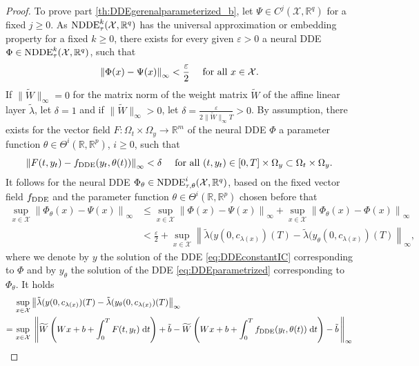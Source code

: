 \documentclass[10pt]{article}
\numberwithin{equation}{section}
\newcommand*{\dd}{\mathrm{d}}
\newcommand{\eps}{\varepsilon}
\newcommand\norm[1]{\left\lVert#1\right\rVert}
\newcommand\normm[1]{\big\lVert#1\big\lVert}
\newcommand\normk[1]{\lVert#1\lVert}
\begin{document}
\begin{proof}
		To prove part \ref{th:DDEgerenalparameterized_b}, let $\Psi \in C^j(\mathcal{X},\mathbb{R}^q)$ for a fixed $j \geq 0$. As $\textup{NDDE}^k_{\tau}(\mathcal{X},\mathbb{R}^q)$ has the universal approximation or embedding property for a fixed $k\geq 0$, there exists for every given $\eps>0$ a neural DDE $\Phi \in \textup{NDDE}^k_{\tau}(\mathcal{X},\mathbb{R}^q)$, such that
		\begin{equation*}
			\norm{\Phi(x)-\Psi(x)}_\infty  < \frac{\varepsilon}{2} \quad \textup{ for all } x \in \mathcal{X}.
		\end{equation*}
		If $\normm{\widetilde{W}}_\infty = 0$ for the matrix norm of the weight matrix $\widetilde{W}$ of the affine linear layer $\tilde \lambda$, let $\delta = 1$ and if $\normm{\widetilde{W}}_\infty >0$, let $\delta = \frac{\eps}{2 \normk{\widetilde{W}}_\infty T} >0$. By assumption, there exists for the vector field $F: \Omega_t \times \Omega_y \rightarrow \mathbb{R}^m$ of the neural DDE $\Phi$ a parameter function $\theta\in\Theta^i(\mathbb{R},\mathbb{R}^{p})$, $i \geq 0$, such that
		\begin{equation*}
			\norm{F(t,y_t)-f_\textup{DDE}(y_t,\theta(t))}_\infty < \delta \quad \textup{ for all } (t,y_t)\in [0,T] \times \Omega_y \subset \Omega_t \times \Omega_y.
		\end{equation*}
		It follows for the neural DDE $\Phi_\theta\in\textup{NDDE}^i_{\tau,\theta}(\mathcal{X},\mathbb{R}^q)$, based on the fixed vector field $f_\textup{DDE}$ and the parameter function $\theta\in\Theta^i(\mathbb{R},\mathbb{R}^{p})$ chosen before that
		\begin{align*}
			\sup_{x \in \mathcal{X}} \norm{\Phi_\theta(x)-\Psi(x)}_\infty &\leq  \sup_{x \in \mathcal{X}} \norm{\Phi(x)-\Psi(x)}_\infty + \sup_{x \in \mathcal{X}} \norm{\Phi_\theta(x)-\Phi(x)}_\infty\\
			&< \frac{\eps}{2} +  \sup_{x \in \mathcal{X}} \norm{\tilde\lambda(y(0,c_{\lambda(x)})(T) - \tilde\lambda(y_\theta(0,c_{\lambda(x)})(T)}_\infty,
		\end{align*}
		where we denote by $y$ the solution of the DDE \eqref{eq:DDEconstantIC} corresponding to $\Phi$ and by $y_\theta$ the solution of the DDE \eqref{eq:DDEparametrized} corresponding to $\Phi_\theta$. It holds
		\begin{align*}
			&\sup_{x \in \mathcal{X}} \norm{\tilde\lambda(y(0,c_{\lambda(x)})(T) - \tilde\lambda(y_\theta(0,c_{\lambda(x)})(T)}_\infty \\
			=\, &\sup_{x \in \mathcal{X}} \; \norm{\widetilde{W}\left( Wx+b + \int_0^T F(t,y_t)  \; \dd t \right) + \tilde{b} - \widetilde{W}\left( Wx+b + \int_0^T f_\textup{DDE}(y_t,\theta(t)) \; \dd t \right) - \tilde{b} \, }_\infty \\

\end{align*}
\end{proof}
\end{document}
